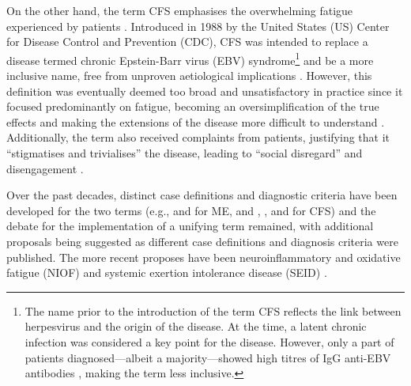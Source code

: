 On the other hand, the term CFS emphasises the overwhelming fatigue experienced by patients \citep{wojcik2011ChronicFatigue}.
Introduced in 1988 by the United States (US) Center for Disease Control and Prevention (CDC), CFS was intended to replace a disease termed chronic Epstein-Barr virus (EBV) syndrome\footnote{The name prior to the introduction of the term CFS reflects the link between herpesvirus and the origin of the disease. At the time, a latent chronic infection was considered a key point for the disease. However, only a part of patients diagnosed---albeit a majority---showed high titres of IgG anti-EBV antibodies \citep{horwitz1985LongtermSerological}, making the term less inclusive.} and be a more inclusive name, free from unproven aetiological implications \citep{holmes1988ChronicFatigue}.
However, this definition was eventually deemed too broad and unsatisfactory in practice since it focused predominantly on fatigue, becoming an oversimplification of the true effects and making the extensions of the disease more difficult to understand \citep{noor2021ComprehensiveUpdate}.
Additionally, the term also received complaints from patients, justifying that it ``stigmatises and trivialises'' the disease, leading to ``social disregard'' and disengagement \citep{instituteofmedicine2015MyalgicEncephalomyelitis}.

Over the past decades, distinct case definitions and diagnostic criteria have been developed for the two terms (e.g., \citealt{hyde2007NightingaleMylagic} and \citealt{carruthers2011MyalgicEncephalomyelitis} for ME, and \citealt{holmes1988ChronicFatigue}, \citealt{sharpe1991ReportChronic}, and \citealt{fukuda1994ChronicFatigue} for CFS) and the debate for the implementation of a unifying term remained, with additional proposals being suggested as different case definitions and diagnosis criteria were published. The more recent proposes have been neuroinflammatory and oxidative fatigue (NIOF) \citep{maes2015NewCase} and systemic exertion intolerance disease (SEID) \citep{instituteofmedicine2015MyalgicEncephalomyelitis}.


